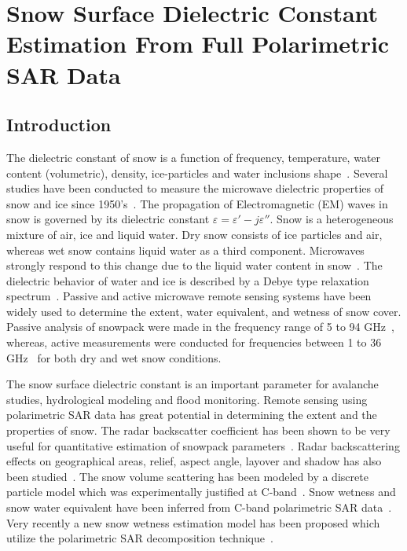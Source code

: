 \chapter{Snow Surface Dielectric Constant Estimation From Full Polarimetric SAR Data}
\section{Introduction}
The dielectric constant of snow is a function of frequency, temperature, water content (volumetric), density, ice-particles and water inclusions shape~\cite{Hallikainen86}. Several studies have been conducted to measure the microwave dielectric properties of snow and ice since 1950's~\cite{Cumming52,sweeny1974measurements,tobarias1978determination,linlor1980permittivity}. The propagation of Electromagnetic (EM) waves in snow is governed by its dielectric constant $\varepsilon = \varepsilon{'}-j\varepsilon{''}$. Snow is a heterogeneous mixture of air, ice and liquid water. Dry snow consists of ice particles and air, whereas wet snow contains liquid water as a third component. Microwaves strongly respond to this change due to the liquid water content in snow~\cite{Hallikainen86,tiuri1984complex,Hallikainen87}. The dielectric behavior of water and ice is described by a Debye type relaxation spectrum~\cite{stiles1980dielectric}. Passive and active microwave remote sensing systems have been widely used to determine the extent, water equivalent, and wetness of snow cover. Passive analysis of snowpack were made in the frequency range of 5 to 94 GHz~\cite{ulaby1980active,stiles1980active,tiuri1982theoretical}, whereas, active measurements were conducted for frequencies between 1 to 36 GHz~\cite{ulaby1980active,matzler1982towards} for both dry and wet snow conditions. 

The snow surface dielectric constant is an important parameter for avalanche studies, hydrological modeling and flood monitoring. Remote sensing using polarimetric SAR data has great potential in determining the extent and the properties of snow. The radar backscatter coefficient has been shown to be very useful for quantitative estimation of snowpack parameters~\cite{Stiles1980,ulaby1986microwave}. Radar backscattering effects on geographical areas, relief, aspect angle, layover and shadow has also been studied~\cite{Koskinen97,Nagler2000,small2011flattening}. The snow volume scattering has been modeled by a discrete particle model which was experimentally justified at C-band~\cite{Kendra98,Koskinen2000}. Snow wetness and snow water equivalent have been inferred from C-band polarimetric SAR data~\cite{Shi95,Shi2000}. Very recently a new snow wetness estimation model has been proposed which utilize the polarimetric SAR decomposition technique~\cite{surendar2015wetness}. 

